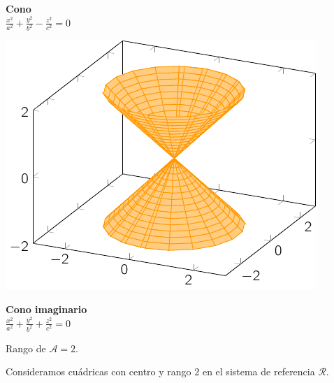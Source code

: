 \begin{minipage}[c]{0.45\textwidth}
  {\bf Cono}\vspace{1em}\\
  $\displaystyle \frac{{x}^2}{a^2} + \frac{{y}^2}{b^2}-\frac{{z}^2}{c^2} = 0$
\end{minipage}\hfill
\begin{minipage}[]{0.45\textwidth}
\includegraphics{./img/cono.pdf}
\end{minipage}

\begin{minipage}[c]{0.45\textwidth}
  {\bf Cono imaginario}\vspace{1em}\\
  $\displaystyle \frac{{x}^2}{a^2} + \frac{{y}^2}{b^2}+\frac{{z}^2}{c^2}=0$
\end{minipage}\hfill
\begin{minipage}[]{0.45\textwidth}
\hfill
\end{minipage}

\vspace{1em}

Rango de $\mathcal A = 2$.

Consideramos cuádricas con centro y rango $2$ en el sistema de referencia $\mathcal R$.

\vspace{1em}

